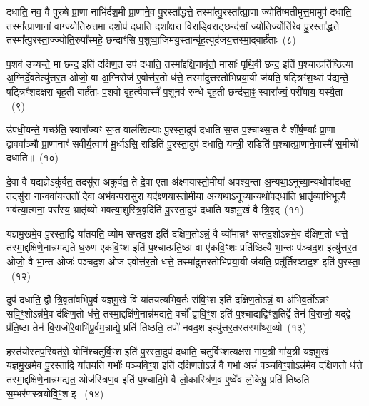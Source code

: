 दधाति॒ नव॒ वै पुरु॑षे प्रा॒णा नाभि॑र्दश॒मी प्रा॒णाने॒व पु॒रस्ता᳚द्धत्ते॒ तस्मा᳚त्पु॒रस्ता᳚त्प्रा॒णा ज्योति॑ष्मतीमुत्त॒मामुप॑ दधाति॒ तस्मा᳚त्प्रा॒णानां॒ वाग्ज्योति॑रुत्त॒मा दशोप॑ दधाति॒ दशा᳚क्षरा वि॒राड्वि॒राट्छन्द॑सां॒ ज्योति॒र्ज्योति॑रे॒व पु॒रस्ता᳚द्धत्ते॒ तस्मा᳚त्पु॒रस्ता॒ज्ज्योति॒रुपा᳚स्महे॒ छन्दाꣳ॑सि प॒शुष्वा॒जिम॑यु॒स्तान्बृ॑ह॒त्युद॑जय॒त्तस्मा॒द्बार्\mbox{}ह॑ताः~(८)\ip

प॒शव॑ उच्यन्ते॒ मा छन्द॒ इति॑ दक्षिण॒त उप॑ दधाति॒ तस्मा᳚द्\-दक्षि॒णावृ॑तो॒ मासाः᳚ पृथि॒वी छन्द॒ इति॑ प॒श्चात्प्रति॑ष्ठित्या अ॒ग्निर्दे॒वतेत्यु॑त्तर॒त ओजो॒ वा अ॒ग्निरोज॑ ए॒वोत्त॑र॒तो ध॑त्ते॒ तस्मा॑दुत्तरतोभिप्रया॒यी ज॑यति॒ षट्त्रिꣳ॑श॒थ्सं प॑द्यन्ते॒ षट्त्रिꣳ॑शदक्षरा बृह॒ती बार्\mbox{}ह॑ताः प॒शवो॑ बृह॒त्यैवास्मै॑ प॒शूनव॑ रुन्धे बृह॒ती छन्द॑सा॒ꣴ॒ स्वारा᳚ज्यं॒ परी॑याय॒ यस्यै॒ता~-~(९)\ip

उ॑पधी॒यन्ते॒ गच्छ॑ति॒ स्वारा᳚ज्यꣳ स॒प्त वाल॑खिल्याः पु॒रस्ता॒दुप॑ दधाति स॒प्त प॒श्चाथ्स॒प्त वै शी॑र्\mbox{}ष॒ण्याः᳚ प्रा॒णा द्वाववा᳚ञ्चौ प्रा॒णानाꣳ॑ सवीर्य॒त्वाय॑ मू॒र्धा\-ऽ\-सि॒ राडिति॑ पु॒रस्ता॒दुप॑ दधाति॒ यन्त्री॒ राडिति॑ प॒श्चात्प्रा॒णाने॒वास्मै॑ स॒मीचो॑ दधाति॥~(१०)\ip

{}

दे॒वा वै यद्य॒ज्ञे\-ऽकु॑र्वत॒ तदसु॑रा अकुर्वत॒ ते दे॒वा ए॒ता अ॑क्ष्णयास्तो॒मीया॑ अपश्य॒न्ता अ॒न्यथा॒\-ऽ\-नूच्या॒न्यथोपा॑दधत॒ तदसु॑रा॒ नान्ववा॑य॒न्ततो॑ दे॒वा अभ॑व॒न्परासु॑रा॒ यद॑क्ष्णयास्तो॒मीया॑ अ॒न्यथा॒\-ऽ\-नूच्या॒न्यथो॑प॒\-दधा॑ति॒ भ्रातृ॑व्याभिभूत्यै॒ भव॑त्या॒त्मना॒ परा᳚स्य॒ भ्रातृ॑व्यो भवत्या॒शुस्त्रि॒वृदिति॑ पु॒रस्ता॒दुप॑ दधाति यज्ञमु॒खं वै त्रि॒वृद्~(११)\ip

य॑ज्ञमु॒खमे॒व पु॒रस्ता॒द्वि या॑तयति॒ व्यो॑म सप्तद॒श इति॑ दक्षिण॒तो\-ऽन्नं॒ वै व्यो॑मान्नꣳ॑ सप्तद॒शो\-ऽन्न॑मे॒व द॑क्षिण॒तो ध॑त्ते॒ तस्मा॒द्दक्षि॑णे॒नान्न॑मद्यते ध॒रुण॑ एकवि॒ꣳ॒श इति॑ प॒श्चात्प्र॑ति॒ष्ठा वा ए॑कवि॒ꣳ॒शः प्रति॑ष्ठित्यै भा॒न्तः प॑ञ्चद॒श इत्यु॑त्तर॒त ओजो॒ वै भा॒न्त ओजः॑ पञ्चद॒श ओज॑ ए॒वोत्त॑र॒तो ध॑त्ते॒ तस्मा॑दुत्तरतोभिप्रया॒यी ज॑यति॒ प्रतू᳚र्तिरष्टाद॒श इति॑ पु॒रस्ता॒-~(१२)\ip

दुप॑ दधाति॒ द्वौ त्रि॒वृता॑वभिपू॒र्वं य॑ज्ञमु॒खे वि या॑तयत्यभिव॒र्तः स॑वि॒ꣳ॒श इति॑ दक्षिण॒तो\-ऽन्नं॒ वा अ॑भिव॒र्तो\-ऽन्नꣳ॑ सवि॒ꣳ॒शो\-ऽन्न॑मे॒व द॑क्षिण॒तो ध॑त्ते॒ तस्मा॒द्दक्षि॑णे॒नान्न॑मद्यते॒ वर्चो᳚ द्वावि॒ꣳ॒श इति॑ प॒श्चाद्यद्विꣳ॑श॒तिर्द्वे तेन॑ वि॒राजौ॒ यद्द्वे प्र॑ति॒ष्ठा तेन॑ वि॒राजो॑रे॒वाभि॑पू॒र्वम॒न्नाद्ये॒ प्रति॑ तिष्ठति॒ तपो॑ नवद॒श इत्यु॑त्तर॒तस्तस्मा᳚थ्स॒व्यो~(१३)\ip

हस्त॑योस्तप॒स्वित॑रो॒ योनि॑श्चतुर्वि॒ꣳ॒श इति॑ पु॒रस्ता॒दुप॑ दधाति॒ चतु॑र्विꣳशत्यक्षरा गाय॒त्री गा॑य॒त्री य॑ज्ञमु॒खं य॑ज्ञमु॒खमे॒व पु॒रस्ता॒द्वि या॑तयति॒ गर्भाः᳚ पञ्चवि॒ꣳ॒श इति॑ दक्षिण॒तो\-ऽन्नं॒ वै गर्भा॒ अन्नं॑ पञ्चवि॒ꣳ॒शो\-ऽन्न॑मे॒व द॑क्षिण॒तो ध॑त्ते॒ तस्मा॒द्दक्षि॑णे॒नान्न॑मद्यत॒ ओज॑स्त्रिण॒व इति॑ प॒श्चादि॒मे वै लो॒कास्त्रि॑ण॒व ए॒ष्वे॑व लो॒केषु॒ प्रति॑ तिष्ठति स॒म्भर॑णस्त्रयोवि॒ꣳ॒श इ-~(१४)\ip

